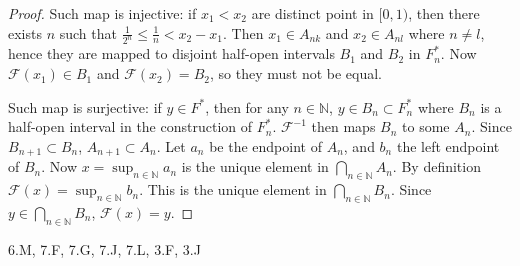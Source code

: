 \begin{proof}
Such map is injective: if $x_1<x_2$ are distinct point in $[0,1)$, then there exists $n$ such that $\frac{1}{2^n}\le \frac{1}{n} < x_2-x_1$. Then $x_1 \in A_{nk }$ and $x_2 \in A_{nl }$ where $n\neq l$, hence they are mapped to disjoint half-open intervals $B_1$ and $B_2$ in $F_n^*$. Now $\mathcal{F}(x_1) \in B_1$ and $\mathcal{F}(x_2) = B_2$, so they must not be equal. 

Such map is surjective: if $y \in F^*$, then for any $n \in \mathbb{N}$, $y \in B_n \subset F_n^*$ where $B_n$ is a half-open interval in the construction of $F_n^*$. $\mathcal{F}^{-1}$ then maps $B_n$ to some $A_n$. Since $B_{n+1} \subset B_n$, $A_{n+1} \subset A_n$. Let $a_n$ be the endpoint of $A_n$, and $b_n$ the left endpoint of $B_n$. Now $x = \operatorname{sup}_{n \in \mathbb{N}}a_n$ is the unique element in $\bigcap_{n \in \mathbb{N} }A_n $. By definition $\mathcal{F}(x) = \operatorname{sup} _{n \in \mathbb{N}} b_n$. This is the unique element in $\bigcap_{n \in \mathbb{N}} B_n$. Since $y \in \bigcap_{n \in \mathbb{N}} B_n$, $\mathcal{F}(x) = y$.
\end{proof}
          

6.M, 7.F, 7.G, 7.J, 7.L, 3.F, 3.J

